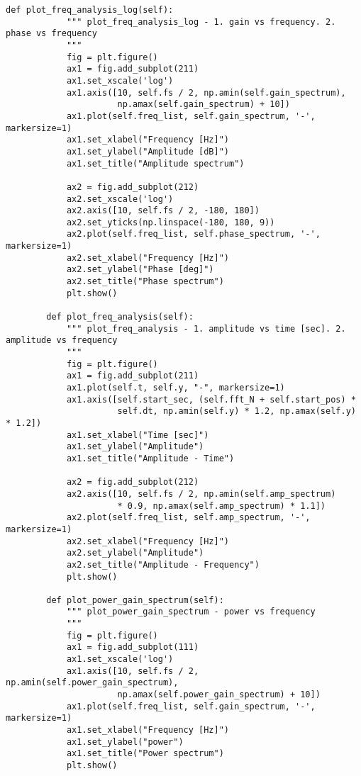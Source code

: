 \begin{lstlisting}[caption=plot\_tools.py,label=plot_tools.py]
        def plot_freq_analysis_log(self):
            """ plot_freq_analysis_log - 1. gain vs frequency. 2. phase vs frequency
            """
            fig = plt.figure()
            ax1 = fig.add_subplot(211)
            ax1.set_xscale('log')
            ax1.axis([10, self.fs / 2, np.amin(self.gain_spectrum),
                      np.amax(self.gain_spectrum) + 10])
            ax1.plot(self.freq_list, self.gain_spectrum, '-', markersize=1)
            ax1.set_xlabel("Frequency [Hz]")
            ax1.set_ylabel("Amplitude [dB]")
            ax1.set_title("Amplitude spectrum")
    
            ax2 = fig.add_subplot(212)
            ax2.set_xscale('log')
            ax2.axis([10, self.fs / 2, -180, 180])
            ax2.set_yticks(np.linspace(-180, 180, 9))
            ax2.plot(self.freq_list, self.phase_spectrum, '-', markersize=1)
            ax2.set_xlabel("Frequency [Hz]")
            ax2.set_ylabel("Phase [deg]")
            ax2.set_title("Phase spectrum")
            plt.show()
    
        def plot_freq_analysis(self):
            """ plot_freq_analysis - 1. amplitude vs time [sec]. 2. amplitude vs frequency
            """
            fig = plt.figure()
            ax1 = fig.add_subplot(211)
            ax1.plot(self.t, self.y, "-", markersize=1)
            ax1.axis([self.start_sec, (self.fft_N + self.start_pos) *
                      self.dt, np.amin(self.y) * 1.2, np.amax(self.y) * 1.2])
            ax1.set_xlabel("Time [sec]")
            ax1.set_ylabel("Amplitude")
            ax1.set_title("Amplitude - Time")
    
            ax2 = fig.add_subplot(212)
            ax2.axis([10, self.fs / 2, np.amin(self.amp_spectrum)
                      * 0.9, np.amax(self.amp_spectrum) * 1.1])
            ax2.plot(self.freq_list, self.amp_spectrum, '-', markersize=1)
            ax2.set_xlabel("Frequency [Hz]")
            ax2.set_ylabel("Amplitude")
            ax2.set_title("Amplitude - Frequency")
            plt.show()
    
        def plot_power_gain_spectrum(self):
            """ plot_power_gain_spectrum - power vs frequency
            """
            fig = plt.figure()
            ax1 = fig.add_subplot(111)
            ax1.set_xscale('log')
            ax1.axis([10, self.fs / 2, np.amin(self.power_gain_spectrum),
                      np.amax(self.power_gain_spectrum) + 10])
            ax1.plot(self.freq_list, self.gain_spectrum, '-', markersize=1)
            ax1.set_xlabel("Frequency [Hz]")
            ax1.set_ylabel("power")
            ax1.set_title("Power spectrum")
            plt.show()
    

\end{lstlisting}
